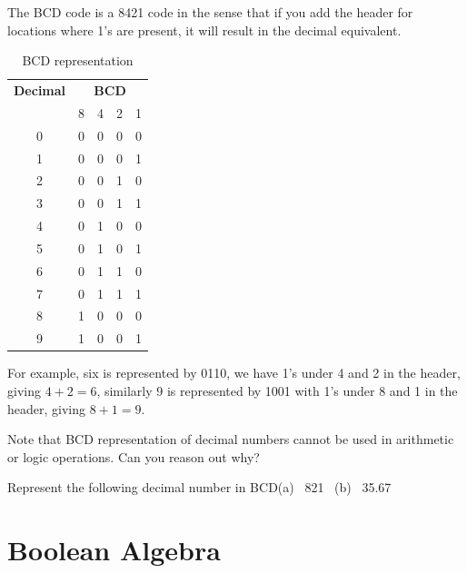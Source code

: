 The BCD code is a 8421 code in the sense that if you add the header for locations where 1's are present, it will result in the decimal equivalent.
\begin{table}[H]
\centering
\caption{BCD representation}\label{tab6.6}
\tabcolsep=10pt
\renewcommand{\arraystretch}{1.3}
\begin{tabular}{|c|cccc|}
\hline
{\bf Decimal} & \multicolumn{4}{c|}{\bf BCD}\\
\cline{2-5}
 & 8 & 4 & 2 & 1\\
\hline
0 & 0 & 0 & 0 & 0\\
1 & 0 & 0 & 0 & 1\\
2 & 0 & 0 & 1 & 0\\
3 & 0 & 0 & 1 & 1\\
4 & 0 & 1 & 0 & 0\\
5 & 0 & 1 & 0 & 1\\
6 & 0 & 1 & 1 & 0\\
7 & 0 & 1 & 1 & 1\\
8 & 1 & 0 & 0 & 0\\
9 & 1 & 0 & 0 & 1\\
\hline
\end{tabular}
\end{table}

For example, six is represented by 0110, we have 1's under 4 and 2 in the header, giving $4+2=6$, similarly 9 is represented by 1001 with 1's under 8 and 1 in the header, giving $8+1=9$.

Note that BCD representation of decimal numbers cannot be used in arithmetic or logic operations. Can you reason out why?

\smallskip
\begin{example}\label{exam6.23}
Represent the following decimal number in BCD\quad (a)~ 821 \ (b)~ 35.67
\end{example}


\eject

\section{Boolean Algebra}\label{sec6.13}

